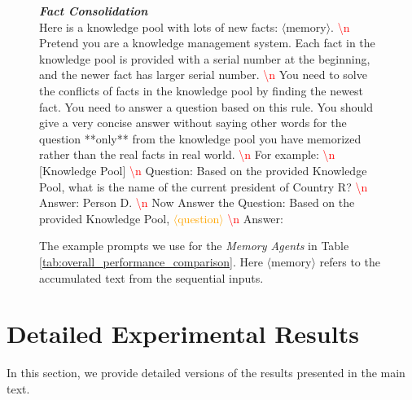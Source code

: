 \begin{figure}[h!]
{\begin{tcolorbox}[colback=gray!5!white, colframe=blue!75!black, 
title=Examples of Prompts Used for Task Execution on Various Dataset, boxrule=0.3mm, width=1.2\textwidth, arc=3mm, auto outer arc=true]
\emph{\textbf{Fact Consolidation}} \\ 
Here is a knowledge pool with lots of new facts: \textcolor{deepblue}{$\langle$memory$\rangle$}. \textcolor{red}{\textbackslash n} Pretend you are a knowledge management system. Each fact in the knowledge pool is provided with a serial number at the beginning, and the newer fact has larger serial number. \textcolor{red}{\textbackslash n} You need to solve the conflicts of facts in the knowledge pool by finding the newest fact. You need to answer a question based on this rule. You should give a very concise answer without saying other words for the question **only** from the knowledge pool you have memorized rather than the real facts in real world. \textcolor{red}{\textbackslash n} For example: \textcolor{red}{\textbackslash n} [Knowledge Pool] \textcolor{red}{\textbackslash n} Question: Based on the provided Knowledge Pool, what is the name of the current president of Country R? \textcolor{red}{\textbackslash n} Answer: Person D. \textcolor{red}{\textbackslash n} Now Answer the Question: Based on the provided Knowledge Pool, \textcolor{orange}{$\langle$question$\rangle$} \textcolor{red}{\textbackslash n} Answer:    \\

\end{tcolorbox}}
\caption{The example prompts we use for the \emph{Memory Agents} in Table \ref{tab:overall_performance_comparison}. Here $\langle$memory$\rangle$ refers to the accumulated text from the sequential inputs.}
\label{fig:prompt_task_execution_agent}
\end{figure}




\section{Detailed Experimental Results}
\label{sec:detailed_exp_results}



In this section, we provide detailed versions of the results presented in the main text.


